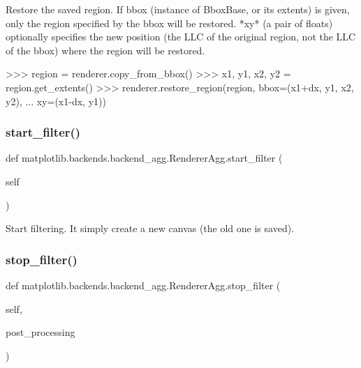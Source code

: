 \begin{DoxyVerb}Restore the saved region. If bbox (instance of BboxBase, or
its extents) is given, only the region specified by the bbox
will be restored. *xy* (a pair of floats) optionally
specifies the new position (the LLC of the original region,
not the LLC of the bbox) where the region will be restored.

>>> region = renderer.copy_from_bbox()
>>> x1, y1, x2, y2 = region.get_extents()
>>> renderer.restore_region(region, bbox=(x1+dx, y1, x2, y2),
...                         xy=(x1-dx, y1))\end{DoxyVerb}
 \mbox{\label{classmatplotlib_1_1backends_1_1backend__agg_1_1RendererAgg_a6ad7cd62e6e72921be1cc4f6e6c9adeb}} 
\subsubsection{\texorpdfstring{start\+\_\+filter()}{start\_filter()}}
{\footnotesize\ttfamily def matplotlib.\+backends.\+backend\+\_\+agg.\+Renderer\+Agg.\+start\+\_\+filter (\begin{DoxyParamCaption}\item[{}]{self }\end{DoxyParamCaption})}

\begin{DoxyVerb}Start filtering. It simply create a new canvas (the old one is saved).
\end{DoxyVerb}
 \mbox{\label{classmatplotlib_1_1backends_1_1backend__agg_1_1RendererAgg_ab9afe8e513e546037eca82c1fa329d95}} 
\subsubsection{\texorpdfstring{stop\+\_\+filter()}{stop\_filter()}}
{\footnotesize\ttfamily def matplotlib.\+backends.\+backend\+\_\+agg.\+Renderer\+Agg.\+stop\+\_\+filter (\begin{DoxyParamCaption}\item[{}]{self,  }\item[{}]{post\+\_\+processing }\end{DoxyParamCaption})}


